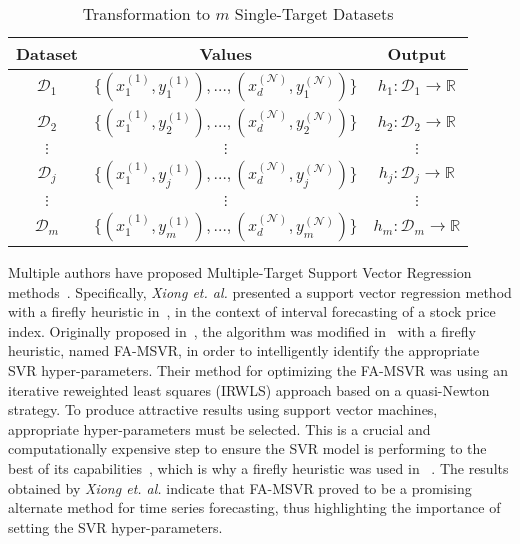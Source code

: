 \documentclass[preprint,12pt]{elsarticle}
\begin{document}
\begin{table}[!t]
\renewcommand{\arraystretch}{1.6}
\centering
\caption{Transformation to $m$ Single-Target Datasets}
\begin{tabular}{ccc}
\hline
Dataset & Values & Output \\
\hline
$\mathcal{D}_1$ & $\{(x_1^{(1)},y_1^{(1)}), \ldots, (x_d^{(\mathcal{N})},y_1^{(\mathcal{N})})\}$ & $h_1 : \mathcal{D}_1 \rightarrow \mathbb{R}$ \\
$\mathcal{D}_2$ & $\{(x_1^{(1)},y_2^{(1)}), \ldots, (x_d^{(\mathcal{N})},y_2^{(\mathcal{N})})\}$ & $h_2 : \mathcal{D}_2 \rightarrow \mathbb{R}$ \\
$\vdots$ & $\vdots$ & $\vdots$ \\
$\mathcal{D}_j$ & $\{(x_1^{(1)},y_j^{(1)}), \ldots, (x_d^{(\mathcal{N})},y_j^{(\mathcal{N})})\}$ & $h_j : \mathcal{D}_j \rightarrow \mathbb{R}$ \\
$\vdots$ & $\vdots$ & $\vdots$ \\
$\mathcal{D}_m$ & $\{(x_1^{(1)},y_m^{(1)}), \ldots, (x_d^{(\mathcal{N})},y_m^{(\mathcal{N})})\}$ & $h_m : \mathcal{D}_m \rightarrow \mathbb{R}$ \\
\hline
\end{tabular}
\label{tab:pt}
\end{table}


Multiple authors have proposed Multiple-Target Support Vector Regression methods~\cite{Borchani2015,Xiong2014,Xu2013}. Specifically, \textit{Xiong et. al.} presented a support vector regression method with a firefly heuristic in~\cite{Xiong2014}, in the context of interval forecasting of a stock price index. Originally proposed in~\cite{msvr}, the algorithm was modified in~\cite{Xiong2014} with a firefly heuristic, named FA-MSVR, in order to intelligently identify the appropriate SVR hyper-parameters. Their method for optimizing the FA-MSVR was using an iterative reweighted least squares (IRWLS) approach based on a quasi-Newton strategy. To produce attractive results using support vector machines, appropriate hyper-parameters must be selected. This is a crucial and computationally expensive step to ensure the SVR model is performing to the best of its capabilities~\cite{Zhao2015160}, which is why a firefly heuristic was used in ~\cite{Xiong2014}. The results obtained by \textit{Xiong et. al.} indicate that FA-MSVR proved to be a promising alternate method for time series forecasting, thus highlighting the importance of setting the SVR hyper-parameters. 
\end{document}
